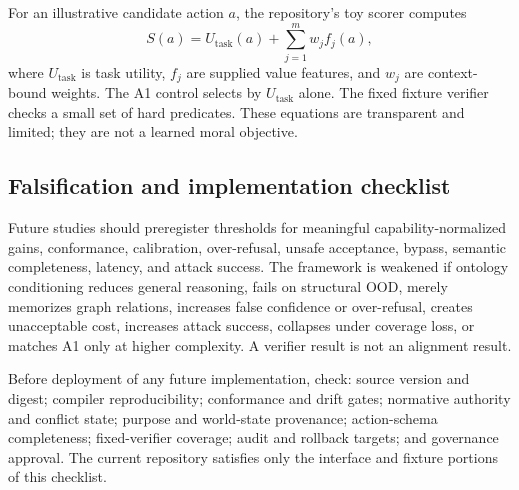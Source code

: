 For an illustrative candidate action $a$, the repository's toy scorer computes
\[
  S(a)=U_{\mathrm{task}}(a)+\sum_{j=1}^{m}w_jf_j(a),
\]
where $U_{\mathrm{task}}$ is task utility, $f_j$ are supplied value features, and $w_j$ are context-bound weights. The A1 control selects by $U_{\mathrm{task}}$ alone. The fixed fixture verifier checks a small set of hard predicates. These equations are transparent and limited; they are not a learned moral objective.

\subsection{Falsification and implementation checklist}

Future studies should preregister thresholds for meaningful capability-normalized gains, conformance, calibration, over-refusal, unsafe acceptance, bypass, semantic completeness, latency, and attack success. The framework is weakened if ontology conditioning reduces general reasoning, fails on structural OOD, merely memorizes graph relations, increases false confidence or over-refusal, creates unacceptable cost, increases attack success, collapses under coverage loss, or matches A1 only at higher complexity. A verifier result is not an alignment result.

Before deployment of any future implementation, check: source version and digest; compiler reproducibility; conformance and drift gates; normative authority and conflict state; purpose and world-state provenance; action-schema completeness; fixed-verifier coverage; audit and rollback targets; and governance approval. The current repository satisfies only the interface and fixture portions of this checklist.
